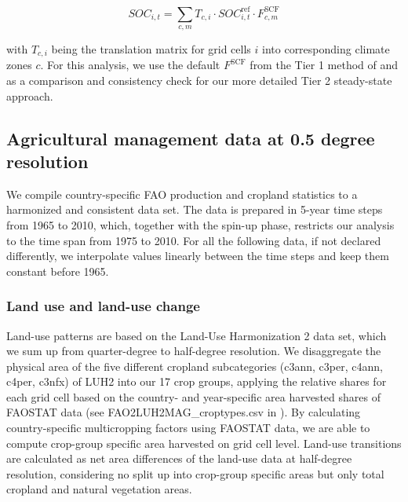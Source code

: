 \documentclass[gc, manuscript]{copernicus}
\begin{document}
\begin{equation}
SOC_{i,t} = \sum_{c,m} T_{c,i} \cdot SOC^{\mathrm{ref}}_{i,t} \cdot F^{\mathrm{SCF}}_{c,m}
\label{eq:tier1}
\end{equation}

with \(T_{c,i}\) being the translation matrix for grid cells \(i\) into corresponding climate zones \(c\). For this analysis, we use the default \(F^{\mathrm{SCF}}\) from the Tier 1 method of \citep{eggleston_ipcc_2006} and \citep{calvo_buendia_ipcc_2019} as a comparison and consistency check for our more detailed Tier 2 steady-state approach.

\hypertarget{sec:agrimanagement}{%
\subsection{Agricultural management data at 0.5 degree resolution}\label{sec:agrimanagement}}

We compile country-specific FAO production and cropland statistics \citep{faostat_faostat_2016} to a harmonized and consistent data set. The data is prepared in 5-year time steps from 1965 to 2010, which, together with the spin-up phase, restricts our analysis to the time span from 1975 to 2010. For all the following data, if not declared differently, we interpolate values linearly between the time steps and keep them constant before 1965.

\hypertarget{sec:landuse}{%
\subsubsection{Land use and land-use change}\label{sec:landuse}}

Land-use patterns are based on the Land-Use Harmonization 2 \citep{hurtt_harmonization_2020} data set, which we sum up from quarter-degree to half-degree resolution. We disaggregate the physical area of the five different cropland subcategories (c3ann, c3per, c4ann, c4per, c3nfx) of LUH2 into our 17 crop groups, applying the relative shares for each grid cell based on the country- and year-specific area harvested shares of FAOSTAT data \citep{faostat_faostat_2016} (see FAO2LUH2MAG\_croptypes.csv in \citep{bodirsky_mrcommons_2020}). By calculating country-specific multicropping factors using FAOSTAT data, we are able to compute crop-group specific area harvested on grid cell level.
Land-use transitions are calculated as net area differences of the land-use data at half-degree resolution, considering no split up into crop-group specific areas but only total cropland and natural vegetation areas.
\end{document}
